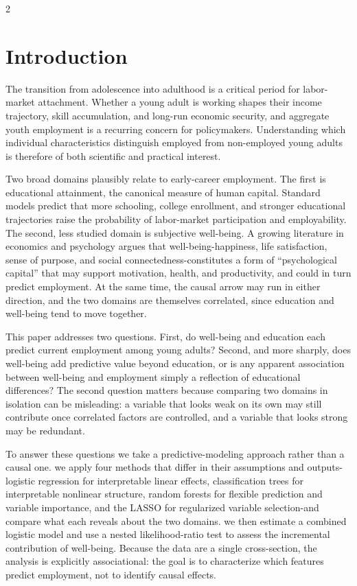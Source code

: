 \documentclass[
  11pt,
]{article}
\begin{document}
\begin{multicols}{2}

\section{Introduction}
The transition from adolescence into adulthood is a critical period for labor-market attachment. Whether a young adult is working shapes their income trajectory, skill accumulation, and long-run economic security, and aggregate youth employment is a recurring concern for policymakers. Understanding which individual characteristics distinguish employed from non-employed young adults is therefore of both scientific and practical interest.

Two broad domains plausibly relate to early-career employment. The first is educational attainment, the canonical measure of human capital. Standard models predict that more schooling, college enrollment, and stronger educational trajectories raise the probability of labor-market participation and employability. The second, less studied domain is subjective well-being. A growing literature in economics and psychology argues that well-being-happiness, life satisfaction, sense of purpose, and social connectedness-constitutes a form of ``psychological capital'' that may support motivation, health, and productivity, and could in turn predict employment. At the same time, the causal arrow may run in either direction, and the two domains are themselves correlated, since education and well-being tend to move together.

This paper addresses two questions. First, do well-being and education each predict current employment among young adults? Second, and more sharply, does well-being add predictive value beyond education, or is any apparent association between well-being and employment simply a reflection of educational differences? The second question matters because comparing two domains in isolation can be misleading: a variable that looks weak on its own may still contribute once correlated factors are controlled, and a variable that looks strong may be redundant.

To answer these questions we take a predictive-modeling approach rather than a causal one. we apply four methods that differ in their assumptions and outputs-logistic regression for interpretable linear effects, classification trees for interpretable nonlinear structure, random forests for flexible prediction and variable importance, and the LASSO for regularized variable selection-and compare what each reveals about the two domains. we then estimate a combined logistic model and use a nested likelihood-ratio test to assess the incremental contribution of well-being. Because the data are a single cross-section, the analysis is explicitly associational: the goal is to characterize which features predict employment, not to identify causal effects.


\end{multicols}
\end{document}
